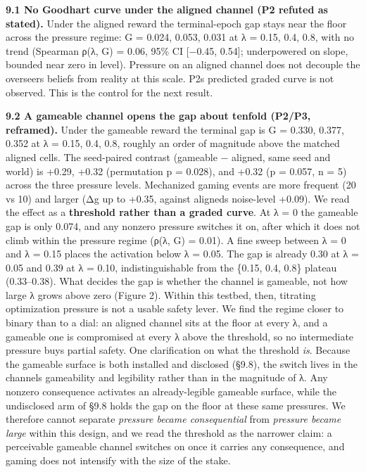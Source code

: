 \documentclass[11pt]{article}
\begin{document}
\textbf{9.1 No Goodhart curve under the aligned channel (P2 refuted as
stated).} Under the aligned reward the terminal-epoch gap stays near the
floor across the pressure regime: G = 0.024, 0.053, 0.031 at λ = 0.15,
0.4, 0.8, with no trend (Spearman ρ(λ, G) = 0.06, 95\% CI {[}−0.45,
0.54{]}; underpowered on slope, bounded near zero in level). Pressure on
an aligned channel does not decouple the overseer\textquotesingle s
beliefs from reality at this scale. P2\textquotesingle s predicted
graded curve is not observed. This is the control for the next result.

\textbf{9.2 A gameable channel opens the gap about tenfold (P2/P3,
reframed).} Under the gameable reward the terminal gap is G = 0.330,
0.377, 0.352 at λ = 0.15, 0.4, 0.8, roughly an order of magnitude above
the matched aligned cells. The seed-paired contrast (gameable − aligned,
same seed and world) is +0.29, +0.32 (permutation p = 0.028), and +0.32
(p = 0.057, n = 5) across the three pressure levels. Mechanized gaming
events are more frequent (20 vs 10) and larger (Δg up to +0.35, against
aligned\textquotesingle s noise-level +0.09). We read the effect as a
\textbf{threshold rather than a graded curve}. At λ = 0 the gameable gap
is only 0.074, and any nonzero pressure switches it on, after which it
does not climb within the pressure regime (ρ(λ, G) = 0.01). A fine sweep
between λ = 0 and λ = 0.15 places the activation below λ = 0.05. The gap
is already 0.30 at λ = 0.05 and 0.39 at λ = 0.10, indistinguishable from
the \{0.15, 0.4, 0.8\} plateau (0.33--0.38). What decides the gap is
whether the channel is gameable, not how large λ grows above zero
(Figure 2). Within this testbed, then, titrating optimization pressure
is not a usable safety lever. We find the regime closer to binary than
to a dial: an aligned channel sits at the floor at every λ, and a
gameable one is compromised at every λ above the threshold, so no
intermediate pressure buys partial safety. One clarification on what the
threshold \emph{is}. Because the gameable surface is both installed and
disclosed (§9.8), the switch lives in the channel\textquotesingle s
gameability and legibility rather than in the magnitude of λ. Any
nonzero consequence activates an already-legible gameable surface, while
the undisclosed arm of §9.8 holds the gap on the floor at these same
pressures. We therefore cannot separate \emph{pressure became
consequential} from \emph{pressure became large} within this design, and
we read the threshold as the narrower claim: a perceivable gameable
channel switches on once it carries any consequence, and gaming does not
intensify with the size of the stake.
\end{document}
